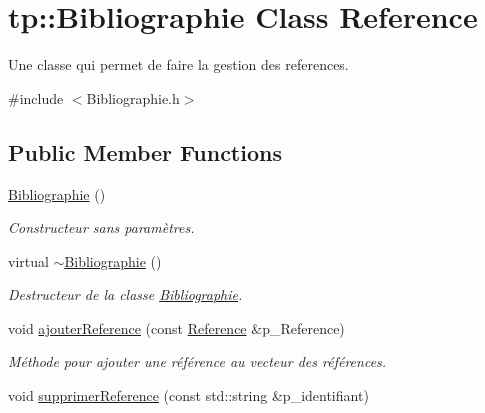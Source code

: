 \hypertarget{classtp_1_1Bibliographie}{}\section{tp\+:\+:Bibliographie Class Reference}
\label{classtp_1_1Bibliographie}


Une classe qui permet de faire la gestion des references.  




{\ttfamily \#include $<$Bibliographie.\+h$>$}

\subsection*{Public Member Functions}
\begin{DoxyCompactItemize}
\item 
\hypertarget{classtp_1_1Bibliographie_a421ef2a88d9bebe630723aef9715fcda}{}\hyperlink{classtp_1_1Bibliographie_a421ef2a88d9bebe630723aef9715fcda}{Bibliographie} ()\label{classtp_1_1Bibliographie_a421ef2a88d9bebe630723aef9715fcda}

\begin{DoxyCompactList}\small\item\em Constructeur sans paramètres. \end{DoxyCompactList}\item 
\hypertarget{classtp_1_1Bibliographie_a6b304f77486829238679d517ec0d5389}{}virtual \hyperlink{classtp_1_1Bibliographie_a6b304f77486829238679d517ec0d5389}{$\sim$\+Bibliographie} ()\label{classtp_1_1Bibliographie_a6b304f77486829238679d517ec0d5389}

\begin{DoxyCompactList}\small\item\em Destructeur de la classe \hyperlink{classtp_1_1Bibliographie}{Bibliographie}. \end{DoxyCompactList}\item 
\hypertarget{classtp_1_1Bibliographie_ac4650643e18de38f4d95e4fbff7614ea}{}void \hyperlink{classtp_1_1Bibliographie_ac4650643e18de38f4d95e4fbff7614ea}{ajouter\+Reference} (const \hyperlink{classtp_1_1Reference}{Reference} \&p\+\_\+\+Reference)\label{classtp_1_1Bibliographie_ac4650643e18de38f4d95e4fbff7614ea}

\begin{DoxyCompactList}\small\item\em Méthode pour ajouter une référence au vecteur des références. \end{DoxyCompactList}\item 
\hypertarget{classtp_1_1Bibliographie_a5a3fc571e6c6dfe1934f766ef5a7fda8}{}void \hyperlink{classtp_1_1Bibliographie_a5a3fc571e6c6dfe1934f766ef5a7fda8}{supprimer\+Reference} (const std\+::string \&p\+\_\+identifiant)\label{classtp_1_1Bibliographie_a5a3fc571e6c6dfe1934f766ef5a7fda8}


\end{DoxyCompactItemize}
